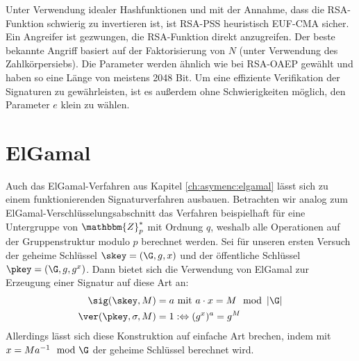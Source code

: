 Unter Verwendung idealer Hashfunktionen und mit der Annahme, dass die RSA-Funktion schwierig zu invertieren ist, ist RSA-PSS heuristisch EUF-CMA sicher. Ein Angreifer ist gezwungen, die RSA-Funktion direkt anzugreifen. Der beste bekannte Angriff basiert auf der Faktorisierung von $N$ (unter Verwendung des Zahlkörpersiebs). Die Parameter werden ähnlich wie bei RSA-OAEP gewählt und haben so eine Länge von meistens 2048 Bit. Um eine effiziente Verifikation der Signaturen zu gewährleisten, ist es außerdem ohne Schwierigkeiten möglich, den Parameter $e$ klein zu wählen.


\section{ElGamal}
Auch das ElGamal-Verfahren aus Kapitel \ref{ch:asymenc:elgamal} lässt sich zu einem funktionierenden Signaturverfahren ausbauen. Betrachten wir analog zum ElGamal-Verschlüsselungsabschnitt das Verfahren beispielhaft für eine Untergruppe von $\mathbbm{Z}^*_p$ mit Ordnung $q$, weshalb alle Operationen auf der Gruppenstruktur modulo $p$ berechnet werden. Sei für unseren ersten Versuch der geheime Schlüssel $\skey = (\G, g, x)$ und der öffentliche Schlüssel $\pkey = (\G, g, g^x)$. Dann bietet sich die Verwendung von ElGamal zur Erzeugung einer Signatur auf diese Art an:
\begin{align*}
\sig(\skey,M) &= a \text{ mit } a \cdot x = M \mod \left|\G\right|\\
\ver(\pkey,\sigma,M) &= 1 :\Leftrightarrow (g^x)^a = g^M
\end{align*}
Allerdings lässt sich diese Konstruktion auf einfache Art brechen, indem mit $x = M a^{-1} \mod \G$ der geheime Schlüssel berechnet wird.


